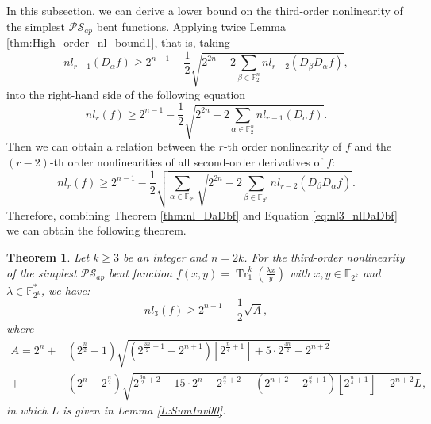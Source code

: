 \documentclass[preprint,10pt]{elsarticle}
\newcommand{\F}{\mathbb{F}}
\newcommand{\0}{\textbf{0}}
\newcommand{\1}{\textbf{1}}
\newcommand{\TRACE}{\operatorname{Tr}_1^k}
\theoremstyle{plain}
\newtheorem{theorem}{Theorem}
\begin{document}
In this subsection,  we can derive a lower bound on the third-order nonlinearity of the simplest $\mathcal{PS}_{ap}$ bent functions.
Applying twice Lemma \ref{thm:High_order_nl_bound1}, that is, taking
    \[nl_{r-1}(D_{\alpha}f) \ge 2^{n-1}-\frac{1}{2}\sqrt{2^{2n}-2\sum_{\beta\in\F_2^n}nl_{r-2}(D_{\beta}D_{\alpha}f)},\]
    into the right-hand side of the following equation
    \[nl_r(f) \ge 2^{n-1}-\frac{1}{2}\sqrt{2^{2n}-2\sum_{\alpha\in\F_2^n}nl_{r-1}(D_{\alpha}f)}.\]
    Then we can obtain a relation between the $r$-th order nonlinearity of $f$ and the $(r-2)$-th order nonlinearities of all second-order derivatives of $f$:
    \begin{equation}\label{eq:nl3_nlDaDbf}
        nl_r(f)\ge 2^{n-1}-\frac{1}{2}\sqrt{\sum_{\alpha\in\F_{2^n}}\sqrt{2^{2n}-2\sum_{\beta\in\F_{2^n}} nl_{r-2}(D_{\beta}D_{\alpha}f)}}.
    \end{equation}
    Therefore, combining Theorem \ref{thm:nl_DaDbf} and Equation \eqref{eq:nl3_nlDaDbf} we can obtain the following theorem.
    \begin{theorem}\label{th:our_lower_bound}
        Let $k\ge 3$ be an integer and $n=2k$. For the third-order nonlinearity of the simplest $\mathcal{PS}_{ap}$ bent function $f(x,y)=\TRACE(\frac{\lambda x}{y})$ with $x,y\in\F_{2^k}$ and $\lambda\in\F_{2^k}^*$, we have:
        \[nl_3(f)\ge 2^{n-1}-\frac{1}{2}\sqrt{A},\]
        where
        \begin{align*}
            A=2^n+&(2^{\frac{n}{2}}-1)\sqrt{(2^{\frac{3n}{2}+1}-2^{n+1})\left\lfloor 2^{\frac{n}{4}+1}\right\rfloor+5\cdot 2^{\frac{3n}{2}}-2^{n+2}}\\
            +&(2^n-2^{\frac{n}{2}})\sqrt{2^{\frac{3n}{2}+2}-15\cdot 2^n-2^{\frac{n}{2}+2}+(2^{n+2}-2^{\frac{n}{2}+1})\left\lfloor 2^{\frac{n}{4}+1}\right\rfloor+2^{n+2}L},
        \end{align*}
       in which $L$ is given in Lemma \ref{L:SumInv00}.
    \end{theorem}
\end{document}

